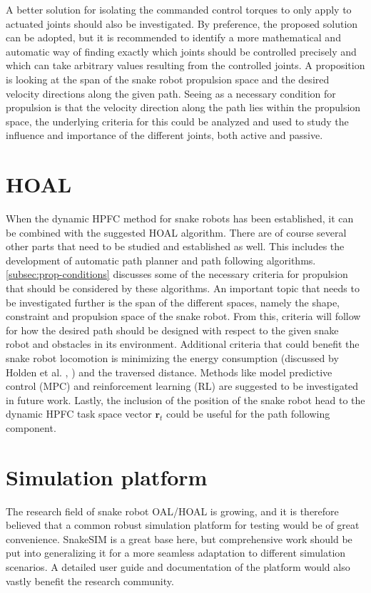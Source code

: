 A better solution for isolating the commanded control torques to only apply to actuated joints should also be investigated. By preference, the proposed solution can be adopted, but it is recommended to identify a more mathematical and automatic way of finding exactly which joints should be controlled precisely and which can take arbitrary values resulting from the controlled joints. A proposition is looking at the span of the snake robot propulsion space and the desired velocity directions along the given path. Seeing as a necessary condition for propulsion is that the velocity direction along the path lies within the propulsion space, the underlying criteria for this could be analyzed and used to study the influence and importance of the different joints, both active and passive.


\section{HOAL}

When the dynamic HPFC method for snake robots has been established, it can be combined with the suggested HOAL algorithm. There are of course several other parts that need to be studied and established as well. This includes the development of automatic path planner and path following algorithms. \ref{subsec:prop-conditions} discusses some of the necessary criteria for propulsion that should be considered by these algorithms. An important topic that needs to be investigated further is the span of the different spaces, namely the shape, constraint and propulsion space of the snake robot. From this, criteria will follow for how the desired path should be designed with respect to the given snake robot and obstacles in its environment. Additional criteria that could benefit the snake robot locomotion is minimizing the energy consumption (discussed by Holden et al. \cite{holden2013optimal}, \cite{holden2014optimal}) and the traversed distance. Methods like model predictive control (MPC) and reinforcement learning (RL) are suggested to be investigated in future work. Lastly, the inclusion of the position of the snake robot head to the dynamic HPFC task space vector $\mathbf{r}_t$ could be useful for the path following component.

\section{Simulation platform}

The research field of snake robot OAL/HOAL is growing, and it is therefore believed that a common robust simulation platform for testing would be of great convenience. SnakeSIM is a great base here, but comprehensive work should be put into generalizing it for a more seamless adaptation to different simulation scenarios. A detailed user guide and documentation of the platform would also vastly benefit the research community.
